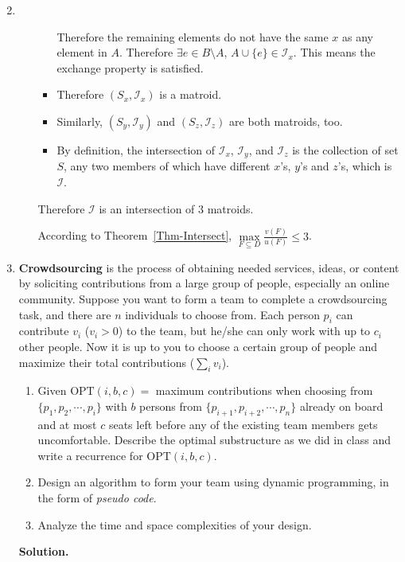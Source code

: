 \documentclass[12pt,a4paper]{article}
\makeatletter
\newtheorem*{solution}{Solution}
\theoremstyle{definition}
\renewenvironment{solution}[1][Solution] {\par\pushQED{\qed}\normalfont\topsep6\p@\@plus6\p@\relax\trivlist\item[\hskip\labelsep\bfseries#1\@addpunct{.}]\ignorespaces}{\popQED\endtrivlist\@endpefalse} \makeatother
\makeatother
\begin{document}
\begin{enumerate}
\begin{solution}
\begin{enumerate}
\begin{itemize}
                Therefore the remaining  elements do not have the same $x$ as any element in $A$. Therefore $\exists e\in B\setminus A$, $A\cup\{e\}\in \mathcal{I}_x$. This means the exchange property is satisfied.
                    \item 
                Therefore $(S_x,\mathcal{I}_x)$ is a matroid.
                    \item 
                Similarly, $(S_y,\mathcal{I}_y)$ and $(S_z,\mathcal{I}_z)$ are both matroids, too.
                    \item 
                By definition, the intersection of $\mathcal{I}_x$, $\mathcal{I}_y$, and $\mathcal{I}_z$ is the collection of set $S$, any two members of which have different $x$'s, $y$'s and $z$'s, which is $\mathcal{I}$.
            \end{itemize}
                Therefore $\mathcal{I}$ is an intersection of $3$ matroids.
                
                According to Theorem~\ref{Thm-Intersect}, $\max\limits_{F \subseteq D} \frac{v(F)}{u(F)} \leq 3$.
            \end{enumerate}
    \end{solution}



	\item
	\textbf{Crowdsourcing} is the process of obtaining needed services, ideas, or content by soliciting contributions from a large group of people, especially an online community. Suppose you want to form a team to complete a crowdsourcing task, and there are $n$ individuals to choose from. Each person $p_i$ can contribute $v_i$ ($v_i > 0$) to the team, but he/she can only work with up to $c_i$ other people. Now it is up to you to choose a certain group of people and maximize their total contributions ($\sum_i{v_i}$).
	
	\begin{enumerate}
		\item Given $\text{OPT}(i, b, c)=$ maximum contributions when choosing from $\{p_1, p_2, \cdots, p_i\}$ with $b$ persons from $\{p_{i+1}, p_{i+2}, \cdots, p_n\}$ already on board and at most $c$ seats left before any of the existing team members gets uncomfortable. Describe the optimal substructure as we did in class and write a recurrence for $\text{OPT}(i, b, c)$.
		\item Design an algorithm to form your team using dynamic programming, in the form of \emph{pseudo code}.
        \item Analyze the time and space complexities of your design.
	\end{enumerate}
    \textbf{Solution.}
    

\end{enumerate}
\end{document}
